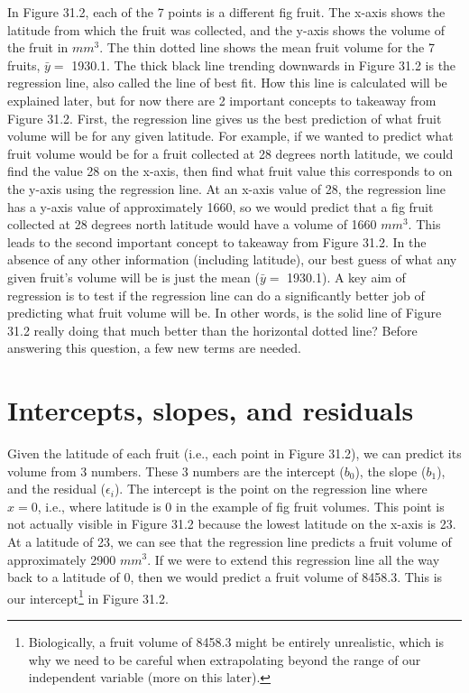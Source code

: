 \documentclass[
]{scrbook}
\begin{document}
In Figure 31.2, each of the 7 points is a different fig fruit.
The x-axis shows the latitude from which the fruit was collected, and the y-axis shows the volume of the fruit in \(mm^{3}\).
The thin dotted line shows the mean fruit volume for the 7 fruits, \(\bar{y} =\) 1930.1.
The thick black line trending downwards in Figure 31.2 is the regression line, also called the line of best fit.
How this line is calculated will be explained later, but for now there are 2 important concepts to takeaway from Figure 31.2.
First, the regression line gives us the best prediction of what fruit volume will be for any given latitude.
For example, if we wanted to predict what fruit volume would be for a fruit collected at 28 degrees north latitude, we could find the value 28 on the x-axis, then find what fruit value this corresponds to on the y-axis using the regression line.
At an x-axis value of 28, the regression line has a y-axis value of approximately 1660, so we would predict that a fig fruit collected at 28 degrees north latitude would have a volume of 1660 \(mm^{3}\).
This leads to the second important concept to takeaway from Figure 31.2.
In the absence of any other information (including latitude), our best guess of what any given fruit's volume will be is just the mean (\(\bar{y} =\) 1930.1).
A key aim of regression is to test if the regression line can do a significantly better job of predicting what fruit volume will be.
In other words, is the solid line of Figure 31.2 really doing that much better than the horizontal dotted line?
Before answering this question, a few new terms are needed.

\hypertarget{intercepts-slopes-and-residuals}{%
\section{Intercepts, slopes, and residuals}\label{intercepts-slopes-and-residuals}}

Given the latitude of each fruit (i.e., each point in Figure 31.2), we can predict its volume from 3 numbers.
These 3 numbers are the intercept (\(b_{0}\)), the slope (\(b_{1}\)), and the residual (\(\epsilon_{i}\)).
The intercept is the point on the regression line where \(x = 0\), i.e., where latitude is 0 in the example of fig fruit volumes.
This point is not actually visible in Figure 31.2 because the lowest latitude on the x-axis is 23.
At a latitude of 23, we can see that the regression line predicts a fruit volume of approximately 2900 \(mm^{3}\).
If we were to extend this regression line all the way back to a latitude of 0, then we would predict a fruit volume of 8458.3.
This is our intercept\footnote{Biologically, a fruit volume of 8458.3 might be entirely unrealistic, which is why we need to be careful when extrapolating beyond the range of our independent variable (more on this later).} in Figure 31.2.
\end{document}
